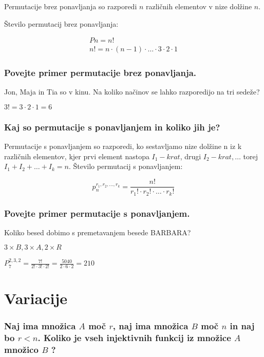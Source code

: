 \documentclass{article}
\begin{document}
Permutacije brez ponavljanja so razporedi $n$ različnih elementov v nize dolžine $n$.

Število permutacij brez ponavljanja:

$$
\begin{gathered}
P n=n ! \\
n !=n \cdot(n-1) \cdot \ldots \cdot 3 \cdot 2 \cdot 1
\end{gathered}
$$

\subsubsection*{Povejte primer permutacije brez ponavljanja.}

Jon, Maja in Tia so v kinu. Na koliko načinov se lahko razporedijo na tri sedeže?

$3 !=3 \cdot 2 \cdot 1=6$

\subsubsection*{Kaj so permutacije s ponavljanjem in koliko jih je?}

Permutacije s ponavljanjem so razporedi, ko sestavljamo nize dolžine $\mathrm{n}$ iz k različnih elementov, kjer prvi element nastopa $I_{1}-k r a t$, drugi $I_{2}-k r a t, \ldots$ torej $I_{1}+I_{2}+\ldots+I_{k}=n$. Število permutacij s ponavljanjem:

$$
p_{n}^{r_{1}, r_{2}, \ldots, r_{k}}=\frac{n !}{r_{1} ! \cdot r_{2} ! \cdot \ldots \cdot r_{k} !}
$$

\subsubsection*{Povejte primer permutacije s ponavljanjem.}

Koliko besed dobimo s premetavanjem besede BARBARA?

$3 \times B, 3 \times A, 2 \times R$

$P_{7}^{2,3,2}=\frac{7 !}{2 ! \cdot 3 ! \cdot 2 !}=\frac{5040}{2 \cdot 6 \cdot 2}=210$

\section{Variacije}
\subsubsection*{Naj ima množica $A$ moč $r$, naj ima množica $B$ moč $n$ in naj bo $r<n$. Koliko je vseh injektivnih funkcij iz množice $A $ množico $B$ ?}
\end{document}
